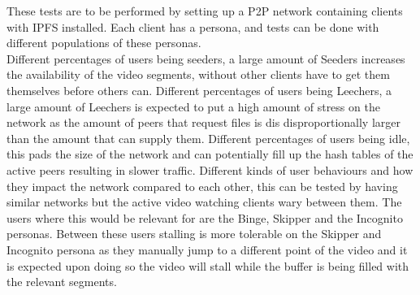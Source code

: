 These tests are to be performed by setting up a \acs{P2P} network containing clients with \acs{IPFS} installed. Each client has a persona, and tests can be done with different populations of these personas.\\
%
%
Different percentages of users being seeders, a large amount of Seeders increases the availability of the video segments, without other clients have to get them themselves before others can.
Different percentages of users being Leechers, a large amount of Leechers is expected to put a high amount of stress on the network as the amount of peers that request files is dis disproportionally larger than the amount that can supply them.
Different percentages of users being idle, this pads the size of the network and can potentially fill up the hash tables of the active peers resulting in slower traffic.
Different kinds of user behaviours and how they impact the network compared to each other, this can be tested by having similar networks but the active video watching clients wary between them. The users where this would be relevant for are the Binge, Skipper and the Incognito personas. Between these users stalling is more tolerable on the Skipper and Incognito persona as they manually jump to a different point of the video and it is expected upon doing so the video will stall while the buffer is being filled with the relevant segments.
